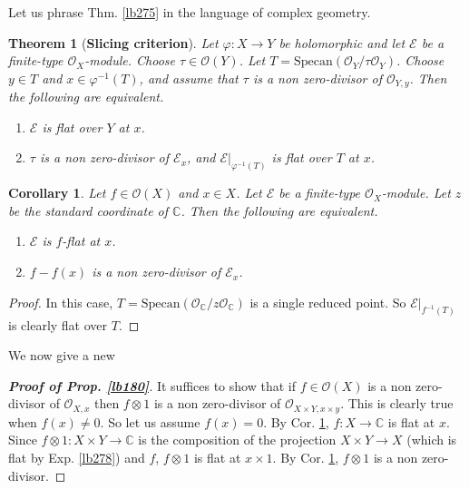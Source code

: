 \documentclass[12pt,b5paper,notitlepage]{report}
\theoremstyle{definition}
\theoremstyle{plain}
\newtheorem{thm}[df]{Theorem}
\newtheorem{co}[df]{Corollary}
\newcommand{\scr}{\mathscr}
\newcommand{\Cbb}{\mathbb C}
\newcommand{\Specan}{\mathrm{Specan}}
\numberwithin{equation}{section}
\begin{document}
Let us phrase Thm. \ref{lb275} in the language of complex geometry.


\begin{thm}[\textbf{Slicing criterion}]\label{lb264}   
Let $\varphi:X\rightarrow Y$ be holomorphic and let $\scr E$ be a finite-type $\scr O_X$-module. Choose $\tau\in\scr O(Y)$. Let $T=\Specan(\scr O_Y/\tau\scr O_Y)$. Choose $y\in T$ and $x\in\varphi^{-1}(T)$, and assume that $\tau$ is a non zero-divisor of $\scr O_{Y,y}$. Then the following are equivalent.
\begin{enumerate}[label=(\arabic*)]
\item $\scr E$ is flat over $Y$ at $x$.
\item $\tau$ is a non zero-divisor of $\scr E_x$, and $\scr E|_{\varphi^{-1}(T)}$ is flat over $T$ at $x$.
\end{enumerate}
\end{thm}




\begin{co}\label{lb276}
Let $f\in\scr O(X)$ and $x\in X$. Let $\scr E$ be a finite-type $\scr O_X$-module. Let $z$ be the standard coordinate of $\Cbb$. Then the following are equivalent.
\begin{enumerate}[label=(\arabic*)]
\item $\scr E$ is $f$-flat at $x$.
\item $f-f(x)$ is a non zero-divisor of $\scr E_x$.
\end{enumerate}
\end{co}

\begin{proof}
In this case, $T=\Specan(\scr O_\Cbb/z\scr O_\Cbb)$ is a single reduced point. So $\scr E|_{f^{-1}(T)}$ is clearly flat over $T$.
\end{proof}


We now give a new

\begin{proof}[\textbf{Proof of Prop. \ref{lb180}}]
It suffices to show that if $f\in\scr O(X)$ is a non zero-divisor of $\scr O_{X,x}$ then $f\otimes 1$ is a non zero-divisor of $\scr O_{X\times Y,x\times y}$. This is clearly true when $f(x)\neq 0$. So let us assume $f(x)=0$. By Cor. \ref{lb276}, $f:X\rightarrow\Cbb$ is flat at $x$. Since $f\otimes 1:X\times Y\rightarrow\Cbb$ is the composition of the projection $X\times Y\rightarrow X$ (which is flat by Exp. \ref{lb278}) and $f$, $f\otimes 1$ is flat at $x\times 1$. By Cor. \ref{lb276}, $f\otimes 1$ is a non zero-divisor.
\end{proof}
\end{document}
